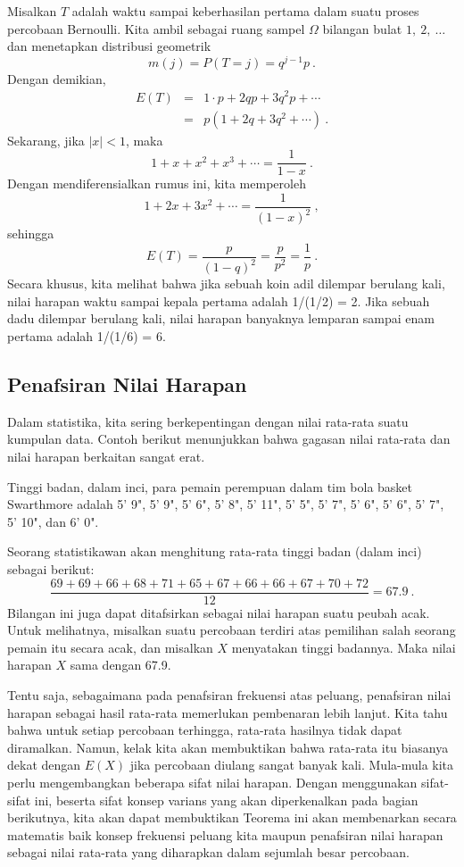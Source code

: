\begin{example}\label{exam 6.8} Misalkan $T$ adalah waktu sampai keberhasilan
pertama dalam suatu proses percobaan Bernoulli. Kita ambil sebagai ruang sampel
$\Omega$ bilangan bulat $1,~2,~\ldots\ $ dan menetapkan distribusi geometrik
$$ m(j) = P(T = j) = q^{j - 1}p\ . $$ Dengan demikian,
\begin{eqnarray*}  E(T) & = & 1 \cdot p + 2qp + 3q^2p +\cdots \\
     & = & p(1 + 2q + 3q^2 +\cdots )\ .
\end{eqnarray*} Sekarang, jika $|x| < 1$, maka
$$ 1 + x + x^2 + x^3 + \cdots = \frac 1{1 - x}\ .$$ Dengan mendiferensialkan rumus
ini, kita memperoleh
$$ 1 + 2x + 3x^2 +\cdots = \frac 1{(1 - x)^2}\ ,$$ sehingga
$$ E(T) = \frac p{(1 - q)^2} = \frac p{p^2} = \frac 1p\ .$$ Secara khusus, kita
melihat bahwa jika sebuah koin adil dilempar berulang kali, nilai harapan waktu sampai
kepala pertama adalah 1/(1/2) = 2. Jika sebuah dadu dilempar berulang kali, nilai
harapan banyaknya lemparan sampai enam pertama adalah 1/(1/6) = 6.
\end{example}

\subsection*{Penafsiran Nilai Harapan}

Dalam statistika, kita sering berkepentingan dengan nilai rata-rata suatu kumpulan
data. Contoh berikut menunjukkan bahwa gagasan nilai rata-rata dan nilai harapan
berkaitan sangat erat.

\begin{example}\label{exam 6.8.5} Tinggi badan, dalam inci, para pemain perempuan
dalam tim bola basket Swarthmore adalah 5' 9", 5' 9", 5' 6", 5' 8", 5' 11",
5' 5", 5' 7", 5' 6", 5' 6", 5' 7", 5' 10", dan 6' 0".
\par Seorang statistikawan akan menghitung rata-rata tinggi badan (dalam inci) sebagai
berikut:
$$\frac{69 + 69 + 66 + 68 + 71 + 65 + 67 + 66 + 66 + 67 + 70 + 72}{12} = 67.9\ .$$
Bilangan ini juga dapat ditafsirkan sebagai nilai harapan suatu peubah acak. Untuk
melihatnya, misalkan suatu percobaan terdiri atas pemilihan salah seorang pemain itu
secara acak, dan misalkan $X$ menyatakan tinggi badannya. Maka nilai harapan $X$ sama
dengan 67.9.
\end{example}

\par Tentu saja, sebagaimana pada penafsiran frekuensi atas peluang, penafsiran nilai
harapan sebagai hasil rata-rata memerlukan pembenaran lebih lanjut. Kita tahu bahwa
untuk setiap percobaan terhingga, rata-rata hasilnya tidak dapat diramalkan. Namun,
kelak kita akan membuktikan bahwa rata-rata itu biasanya dekat dengan $E(X)$ jika
percobaan diulang sangat banyak kali. Mula-mula kita perlu mengembangkan beberapa
sifat nilai harapan. Dengan menggunakan sifat-sifat ini, beserta sifat konsep varians
yang akan diperkenalkan pada bagian berikutnya, kita akan dapat membuktikan
 Teorema ini akan membenarkan secara matematis baik konsep
frekuensi peluang kita maupun penafsiran nilai harapan sebagai nilai rata-rata yang
diharapkan dalam sejumlah besar percobaan.


